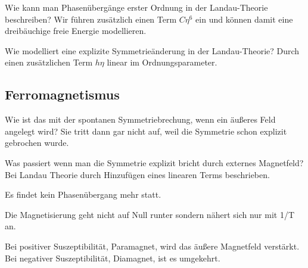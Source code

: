 \begin{fquestion}{Wie kann man Phasenübergänge erster Ordnung in der Landau-Theorie beschreiben?}
    Wir führen zusätzlich einen Term $C \eta^6$ ein und können damit eine dreibäuchige freie Energie modellieren.
\end{fquestion}

\begin{fquestion}{Wie modelliert eine explizite Symmetrieänderung in der Landau-Theorie?}
    Durch einen zusätzlichen Term $h \eta$ linear im Ordnungsparameter.
\end{fquestion}




\subsection{Ferromagnetismus}


\begin{fquestion}{Wie ist das mit der spontanen Symmetriebrechung, wenn ein äußeres Feld angelegt wird? }
    Sie tritt dann gar nicht auf, weil die Symmetrie schon explizit gebrochen wurde.
\end{fquestion}


\begin{fquestion}{Was passiert wenn man die Symmetrie explizit bricht durch externes Magnetfeld?}
    Bei Landau Theorie durch Hinzufügen eines linearen Terms beschrieben. 
    
    Es findet kein Phasenübergang mehr statt. 
    
    Die Magnetisierung geht nicht auf Null runter sondern nähert sich nur mit 1/T an.
    
    Bei positiver Suszeptibilität, Paramagnet, wird das äußere Magnetfeld verstärkt. Bei negativer Suszeptibilität, Diamagnet, ist es umgekehrt. 
\end{fquestion}


